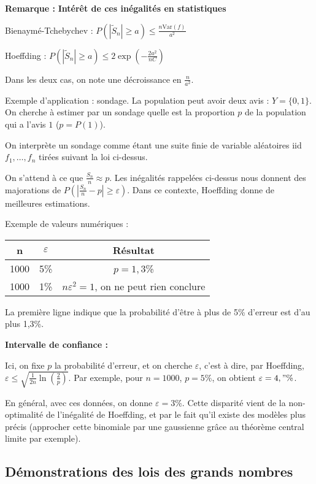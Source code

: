 \documentclass[10pt,a4paper,notitlepage ]{report}
\newcommand{\eps}{\varepsilon}
\newcommand{\var}{\mathrm{Var}}
\newcounter{th}
\newenvironment{rem}{
	
	\textbf{Remarque :}}{}
\begin{document}
\begin{rem}
	\textbf{Intérêt de ces inégalités en statistiques}
	
	Bienaymé-Tchebychev : $P(|\tilde S_n| \ge a) \le \frac{n\var(f)}{a^2}$
	
	Hoeffding : $P(|\tilde S_n| \ge a) \le 2\exp(-\frac{2a^2}{nC})$
	
	Dans les deux cas, on note une décroissance en $\frac n {a^2}$.

	Exemple d'application : sondage. La population peut avoir deux avis : $Y = \{ 0, 1\}$. On cherche à estimer par un sondage quelle est la proportion $p$ de la population qui a l'avis $1$ ($p=P(1)$).
	
	On interprète un sondage comme étant une suite finie de variable aléatoires iid $f_1, \dots, f_n$ tirées suivant la loi ci-dessus.
	
	On s'attend à ce que $\frac {S_n} n \approx p$. Les inégalités rappelées ci-dessus nous donnent des majorations de $P\left(\left|\frac{S_n} n - p \right| \ge \eps \right)$. Dans ce contexte, Hoeffding donne de meilleures estimations.
	
	Exemple de valeurs numériques :
	\begin{center}
		\begin{tabular}{|c|c||c|}
			\hline
			n & $\eps$ & Résultat \\
			\hline
			1000 & 5\% & $p=1,3$\% \\
			\hline
			1000 & 1\% & $n\eps^2 =1$, on ne peut rien conclure \\
			\hline
		\end{tabular}
	\end{center}

	La première ligne indique que la probabilité d'être à plus de 5\% d'erreur est d'au plus 1,3\%.
	
	\textbf{Intervalle de confiance :}
	
	Ici, on fixe $p$ la probabilité d'erreur, et on cherche $\eps$, c'est à dire, par Hoeffding, $\eps \le \sqrt{\frac 1 {2n} \ln\left(\frac 2 p \right)}$. Par exemple, pour $n=1000$, $p=5\%$, on obtient $\eps=4,"\%$.
	
	En général, avec ces données, on donne $\eps = 3\%$. Cette disparité vient de la non-optimalité de l'inégalité de Hoeffding, et par le fait qu'il existe des modèles plus précis (approcher cette binomiale par une gaussienne grâce au théorème central limite par exemple).
\end{rem}

\subsection{Démonstrations des lois des grands nombres}
\end{document}
